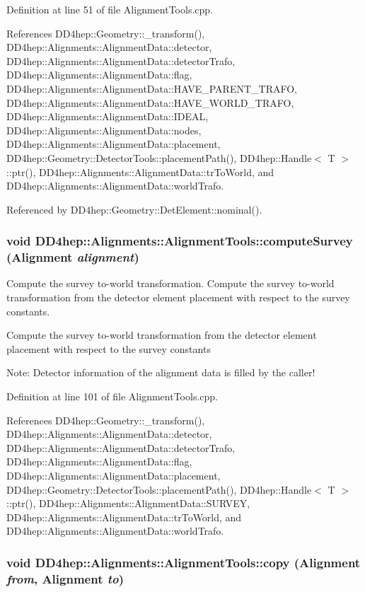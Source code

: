 Definition at line 51 of file AlignmentTools.cpp.

References DD4hep::Geometry::\_\-transform(), DD4hep::Alignments::AlignmentData::detector, DD4hep::Alignments::AlignmentData::detectorTrafo, DD4hep::Alignments::AlignmentData::flag, DD4hep::Alignments::AlignmentData::HAVE\_\-PARENT\_\-TRAFO, DD4hep::Alignments::AlignmentData::HAVE\_\-WORLD\_\-TRAFO, DD4hep::Alignments::AlignmentData::IDEAL, DD4hep::Alignments::AlignmentData::nodes, DD4hep::Alignments::AlignmentData::placement, DD4hep::Geometry::DetectorTools::placementPath(), DD4hep::Handle$<$ T $>$::ptr(), DD4hep::Alignments::AlignmentData::trToWorld, and DD4hep::Alignments::AlignmentData::worldTrafo.

Referenced by DD4hep::Geometry::DetElement::nominal().\hypertarget{namespace_d_d4hep_1_1_alignments_1_1_alignment_tools_af9a9447a5a7239e67ab41f0157931822}{
\subsubsection[{computeSurvey}]{\setlength{\rightskip}{0pt plus 5cm}void DD4hep::Alignments::AlignmentTools::computeSurvey ({\bf Alignment} {\em alignment})}}
\label{namespace_d_d4hep_1_1_alignments_1_1_alignment_tools_af9a9447a5a7239e67ab41f0157931822}


Compute the survey to-\/world transformation. Compute the survey to-\/world transformation from the detector element placement with respect to the survey constants.

Compute the survey to-\/world transformation from the detector element placement with respect to the survey constants

Note: Detector information of the alignment data is filled by the caller! 

Definition at line 101 of file AlignmentTools.cpp.

References DD4hep::Geometry::\_\-transform(), DD4hep::Alignments::AlignmentData::detector, DD4hep::Alignments::AlignmentData::detectorTrafo, DD4hep::Alignments::AlignmentData::flag, DD4hep::Alignments::AlignmentData::placement, DD4hep::Geometry::DetectorTools::placementPath(), DD4hep::Handle$<$ T $>$::ptr(), DD4hep::Alignments::AlignmentData::SURVEY, DD4hep::Alignments::AlignmentData::trToWorld, and DD4hep::Alignments::AlignmentData::worldTrafo.\hypertarget{namespace_d_d4hep_1_1_alignments_1_1_alignment_tools_a03e005e692b6427d78828d1785791a50}{
\subsubsection[{copy}]{\setlength{\rightskip}{0pt plus 5cm}void DD4hep::Alignments::AlignmentTools::copy ({\bf Alignment} {\em from}, \/  {\bf Alignment} {\em to})}}
\label{namespace_d_d4hep_1_1_alignments_1_1_alignment_tools_a03e005e692b6427d78828d1785791a50}


